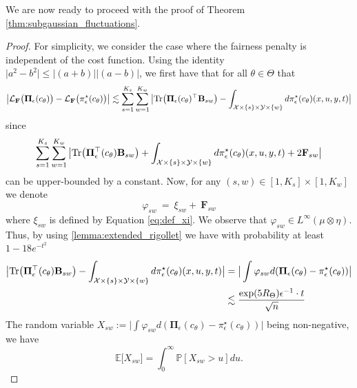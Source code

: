\documentclass{article}
\theoremstyle{definition}
\newcommand{\bbE}{\mathbb{E}}
\newcommand{\bbP}{\mathbb{P}}
\begin{document}
We are now ready to proceed with the proof of Theorem \ref{thm:subgaussian_fluctuations}. 
\begin{proof}
For simplicity, we consider the case where the fairness penalty is independent of the cost function. Using the identity $\big\lvert a^2-b^2\big\lvert \leq \big\lvert(a+b)\big\lvert\big\lvert(a-b)\big\lvert$, we first have that for all $\theta \in \Theta$ that
    \begin{align*}
        \big\lvert \mathcal{L}_\mathbf{F}\big(\mathbf{\Pi}_\epsilon(c_\theta)\big) - \mathcal{L}_\mathbf{F}\big(\pi^\star_\epsilon(c_\theta)\big)\big\lvert 
        \lesssim \sum\limits_{s=1}^{K_s}\sum\limits_{w=1}^{K_w}\big\lvert  \textnormal{Tr}\big(\mathbf{\Pi}_\epsilon(c_\theta)^\top\mathbf{B}_{sw}\big)- \int_{\mathcal{X}\times\lbrace s\rbrace\times\mathcal{Y}\times \lbrace w\rbrace}d\pi^\star_\epsilon(c_\theta)(x,u,y,t) \big\lvert\\
        \end{align*}
        since 
        \begin{align*}
             \sum_{s=1}^{K_s}\sum_{w=1}^{K_w}\big\lvert  \textnormal{Tr}\big(\mathbf{\Pi}_\epsilon^\top(c_\theta)\mathbf{B}_{sw}\big)+ \int_{\mathcal{X}\times\lbrace s\rbrace\times\mathcal{Y}\times \lbrace w\rbrace}d\pi^\star_\epsilon(c_\theta)(x,u,y,t) + 2\mathbf{F}_{sw}\big\lvert  
        \end{align*}
        can be upper-bounded by a constant. Now, for any $(s,w)\in[1,K_s]\times[1,K_w]$ we denote $$\varphi_{sw}~=~\xi_{sw}+~\mathbf{F}_{sw}$$ where $\xi_{sw}$ is defined by Equation \eqref{eq:def_xi}. We observe that $\varphi_{sw}\in L^\infty(\mu\otimes\eta)$. Thus, by using \cref{lemma:extended_rigollet} we have with probability at least $1-18e^{-t^2}$
        \begin{align}\nonumber
        \big\lvert\textnormal{Tr}\big(\mathbf{\Pi}_\epsilon^\top(c_\theta)\mathbf{B}_{sw}\big)- \int_{\mathcal{X}\times\lbrace s\rbrace\times\mathcal{Y}\times \lbrace w\rbrace}d\pi^\star_\epsilon(c_\theta)(x,u,y,t) \big\lvert &= \big\lvert \int \varphi_{sw} d(\mathbf{\Pi}_\epsilon(c_\theta)-\pi^\star_\epsilon(c_\theta))\big\lvert\\\label{eq:int_bound}
        &\lesssim \frac{\exp(5R_\Theta)\epsilon^{-1}\cdot t}{\sqrt{n}} 
    \end{align}
    The random variable $X_{sw} := \big\lvert\int \varphi_{sw} d(\mathbf{\Pi}_\epsilon(c_\theta)-\pi^\star_\epsilon(c_\theta))\big\rvert$ being non-negative, we have 
    $$
        \bbE\big[X_{sw}\big] = \int_0^\infty \bbP[X_{sw}>u]du.
$$
\end{proof}
\end{document}
